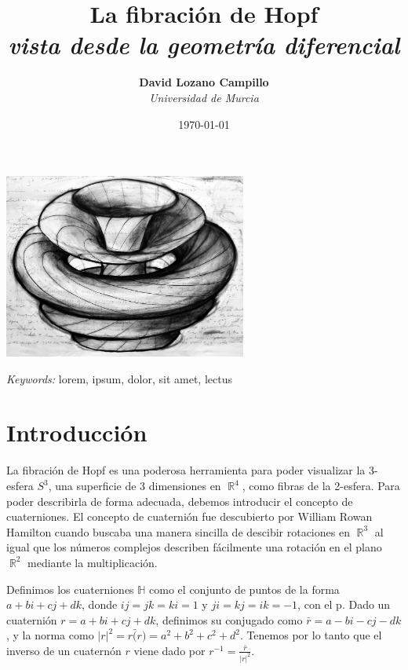 \documentclass[11pt]{diazessay} %
\title{\textbf{La fibración de Hopf} \\ {\Large\itshape vista desde la geometría diferencial}} %
\author{\textbf{David Lozano Campillo} \\ \textit{Universidad de Murcia}} %
\date{\today} %
\DeclareMathOperator{\R}{\mathbb{R}}
\begin{document}
\maketitle %

\begin{center}\includegraphics[width=8cm]{Figures/tsai.jpeg}\end{center}
\vspace{1cm}

\begin{abstract}

\end{abstract}

\hspace*{3.6mm}\textit{Keywords:} lorem, ipsum, dolor, sit amet, lectus %

\vspace{30pt}


\section*{Introducción}

La fibración de Hopf es una poderosa herramienta para poder visualizar la 3-esfera $S^3$, una superficie de 3 dimensiones en $\R^4$, como fibras de la 2-esfera. Para poder describirla de forma adecuada, debemos introducir el concepto de cuaterniones. El concepto de cuaternión fue descubierto por William Rowan Hamilton cuando buscaba una manera sincilla de descibir rotaciones en $\R^3$ al igual que los números complejos describen fácilmente una rotación en el plano $\R^2$ mediante la multiplicación.

Definimos los cuaterniones $\mathbb{H}$ como el conjunto de puntos de la forma $a+bi+cj+dk$, donde $ij=jk=ki=1$ y $ji=kj=ik=-1$, con el p. Dado un cuaternión $r=a+bi+cj+dk$, definimos su conjugado como $\bar{r}=a-bi-cj-dk$, y la norma como $|r|^2 = r\bar(r) = a^2+b^2+c^2+d^2$. Tenemos por lo tanto que el inverso de un cuaternón $r$ viene dado por $r^{-1}=\frac{\bar{r}}{|r|^2}$.
\end{document}
